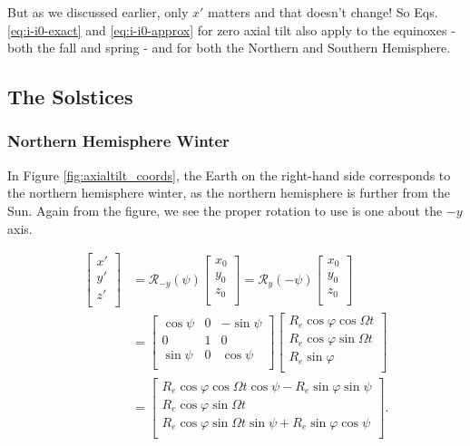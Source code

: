 \documentclass[10pt]{article}
\begin{document}
But as we discussed earlier, only $x'$ matters and that doesn't change! So Eqs. \eqref{eq:i-i0-exact} and \eqref{eq:i-i0-approx} for zero axial tilt also apply to the equinoxes - both the fall and spring - and for both the Northern and Southern Hemisphere. 

\subsection{The Solstices}

\subsubsection{Northern Hemisphere Winter}

In Figure \ref{fig:axialtilt_coords}, the Earth on the right-hand side corresponds to the northern hemisphere winter, as the northern hemisphere is further from the Sun. Again from the figure, we see the proper rotation to use is one about the $-y$ axis.

\begin{align}
\left[ \begin{array}{c}
	x' \\
	y' \\
	z' \\
\end{array} \right] 
&=  \mathcal{R}_{-y} (\psi)
\left[ \begin{array}{c}
	x_0 \\
	y_0 \\
	z_0 \\
\end{array} \right] 
= \mathcal{R}_{y} (-\psi)
\left[ \begin{array}{c}
	x_0 \\
	y_0 \\
	z_0 \\
\end{array} \right] \nonumber \\[0.6em] 
&=
\left[ \begin{array}{ccc}
	\cos \psi  & 0 & -\sin \psi \\
	0 & 1 & 0 \\
	\sin \psi & 0 & \cos \psi \\
\end{array} \right]
\left[ \begin{array}{ccc}
	R_e \cos \varphi \cos \Omega t \\
	R_e \cos \varphi \sin \Omega t\\
	R_e \sin \varphi \\
\end{array} \right] \nonumber \\[0.6em]
&=
\left[ \begin{array}{c}
	R_e \cos \varphi \cos \Omega t \cos \psi - R_e \sin \varphi \sin \psi \\
	R_e \cos \varphi \sin \Omega t \\
	R_e \cos \varphi \sin \Omega t \sin \psi + R_e \sin \varphi \cos \psi \\
\end{array} \right].
\end{align}
\end{document}

